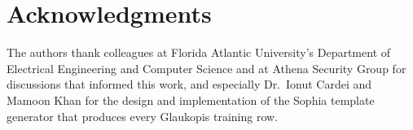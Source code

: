 \documentclass[unnumsec,webpdf,contemporary,large]{oup-authoring-template}
\theoremstyle{thmstyleone}
\theoremstyle{thmstyletwo}
\theoremstyle{thmstylethree}
\begin{document}
\section{Acknowledgments}
The authors thank colleagues at Florida Atlantic University's Department of Electrical Engineering and Computer Science and at Athena Security Group for discussions that informed this work, and especially Dr.~Ionut Cardei and Mamoon Khan for the design and implementation of the Sophia template generator that produces every Glaukopis training row.




\end{document}

